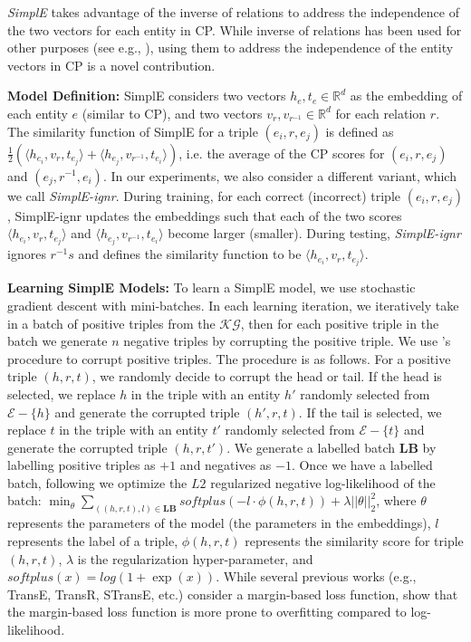 \documentclass{article}
\newcommand{\entities}{\ensuremath{\mathcal{E}}}
\newcommand{\KG}{\ensuremath{\mathcal{KG}}}
\newcommand{\triple}[3]{(\mathit{#1}, \mathit{#2}, \mathit{#3})}
\begin{document}
\emph{SimplE} takes advantage of the inverse of relations to address the independence of the two vectors for each entity in CP. While inverse of relations has been used for other purposes (see e.g., \cite{lao2010relational,lin2015modeling,das2017go}), using them to address the independence of the entity vectors in CP is a novel contribution.

\textbf{Model Definition:} SimplE considers two vectors $h_e,t_e\in\mathbb{R}^d$ as the embedding of each entity $e$ (similar to CP), and two vectors $v_r,v_{r^{-1}}\in\mathbb{R}^d$ for each relation $r$. The similarity function of SimplE for a triple $\triple{e_i}{r}{e_j}$ is defined as $\frac{1}{2}(\langle h_{e_i}, v_r, t_{e_j} \rangle + \langle h_{e_j}, v_{r^{-1}}, t_{e_i} \rangle)$, i.e. the average of the CP scores for $\triple{e_i}{r}{e_j}$ and $\triple{e_j}{r^{-1}}{e_i}$.
In our experiments, we also consider a different variant, which we call \emph{SimplE-ignr}. 
During training, for each correct (incorrect) triple $\triple{e_i}{r}{e_j}$, SimplE-ignr updates the embeddings such that each of the two scores $\langle h_{e_i}, v_{r}, t_{e_j} \rangle$ and $\langle h_{e_j}, v_{r^{-1}}, t_{e_i} \rangle$ become larger (smaller).
During testing, \emph{SimplE-ignr} ignores $r^{-1}s$ and defines the similarity function to be $\langle h_{e_i}, v_{r}, t_{e_j} \rangle$. 

\textbf{Learning SimplE Models:} To learn a SimplE model, we use stochastic gradient descent with mini-batches. In each learning iteration, we iteratively take in a batch of positive triples from the \KG, then for each positive triple in the batch we generate $n$ negative triples by corrupting the positive triple. We use \citet{bordes2013translating}'s procedure to corrupt positive triples. The procedure is as follows. For a positive triple $\triple{h}{r}{t}$, we randomly decide to corrupt the head or tail. If the head is selected, we replace $h$ in the triple with an entity $h'$ randomly selected from $\entities - \{h\}$ and generate the corrupted triple $\triple{h'}{r}{t}$. If the tail is selected, we replace $t$ in the triple with an entity $t'$ randomly selected from $\entities - \{t\}$ and generate the corrupted triple $\triple{h}{r}{t'}$. We generate a labelled batch $\mathbf{LB}$ by labelling positive triples as $+1$ and negatives as $-1$.
Once we have a labelled batch, following \cite{trouillon2016complex} we optimize the $L2$ regularized negative log-likelihood of the batch:
$\min_{\theta} \sum_{(\triple{h}{r}{t}, l) \in \mathbf{LB}} softplus(-l\cdot \phi\triple{h}{r}{t}) + \lambda ||\theta||_2^2$, 
where $\theta$ represents the parameters of the model (the parameters in the embeddings), $l$ represents the label of a triple, $\phi\triple{h}{r}{t}$ represents the similarity score for triple $\triple{h}{r}{t}$, $\lambda$ is the regularization hyper-parameter, and $softplus(x)=log(1+\exp(x))$. While several previous works (e.g., TransE, TransR, STransE, etc.) consider a margin-based loss function, \citet{trouillon2017complex} show that the margin-based loss function is more prone to overfitting compared to log-likelihood.
\end{document}
